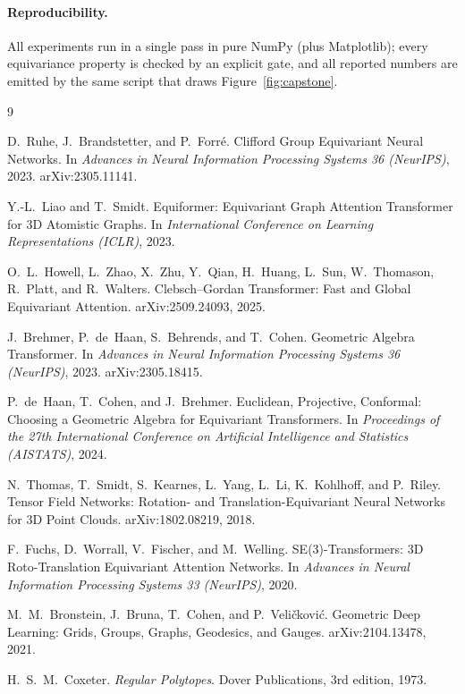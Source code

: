 \documentclass[10pt]{article}
\begin{document}
\paragraph{Reproducibility.}
All experiments run in a single pass in pure NumPy (plus Matplotlib); every equivariance property is checked by an explicit gate, and all reported numbers are emitted by the same script that draws Figure~\ref{fig:capstone}.

\begin{thebibliography}{9}

D.~Ruhe, J.~Brandstetter, and P.~Forr\'e.
\newblock Clifford Group Equivariant Neural Networks.
\newblock In \emph{Advances in Neural Information Processing Systems 36 (NeurIPS)}, 2023.
\newblock arXiv:2305.11141.

Y.-L.~Liao and T.~Smidt.
\newblock Equiformer: Equivariant Graph Attention Transformer for 3D Atomistic Graphs.
\newblock In \emph{International Conference on Learning Representations (ICLR)}, 2023.

O.~L.~Howell, L.~Zhao, X.~Zhu, Y.~Qian, H.~Huang, L.~Sun, W.~Thomason, R.~Platt, and R.~Walters.
\newblock Clebsch--Gordan Transformer: Fast and Global Equivariant Attention.
\newblock arXiv:2509.24093, 2025.

J.~Brehmer, P.~de~Haan, S.~Behrends, and T.~Cohen.
\newblock Geometric Algebra Transformer.
\newblock In \emph{Advances in Neural Information Processing Systems 36 (NeurIPS)}, 2023.
\newblock arXiv:2305.18415.

P.~de~Haan, T.~Cohen, and J.~Brehmer.
\newblock Euclidean, Projective, Conformal: Choosing a Geometric Algebra for Equivariant Transformers.
\newblock In \emph{Proceedings of the 27th International Conference on Artificial Intelligence and Statistics (AISTATS)}, 2024.

N.~Thomas, T.~Smidt, S.~Kearnes, L.~Yang, L.~Li, K.~Kohlhoff, and P.~Riley.
\newblock Tensor Field Networks: Rotation- and Translation-Equivariant Neural Networks for 3D Point Clouds.
\newblock arXiv:1802.08219, 2018.

F.~Fuchs, D.~Worrall, V.~Fischer, and M.~Welling.
\newblock SE(3)-Transformers: 3D Roto-Translation Equivariant Attention Networks.
\newblock In \emph{Advances in Neural Information Processing Systems 33 (NeurIPS)}, 2020.

M.~M.~Bronstein, J.~Bruna, T.~Cohen, and P.~Veli\v{c}kovi\'c.
\newblock Geometric Deep Learning: Grids, Groups, Graphs, Geodesics, and Gauges.
\newblock arXiv:2104.13478, 2021.

H.~S.~M.~Coxeter.
\newblock \emph{Regular Polytopes}.
\newblock Dover Publications, 3rd edition, 1973.

\end{thebibliography}
\end{document}
